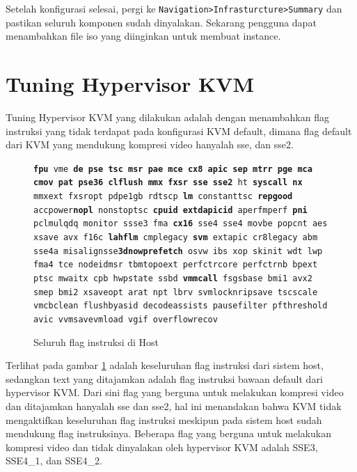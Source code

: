 Setelah konfigurasi selesai, pergi ke \texttt{Navigation>Infrasturcture>Summary} dan pastikan seluruh komponen sudah dinyalakan. Sekarang pengguna dapat menambahkan file iso yang diinginkan untuk membuat instance.

\section{Tuning Hypervisor KVM}
Tuning Hypervisor KVM yang dilakukan adalah dengan menambahkan flag instruksi yang tidak terdapat pada konfigurasi KVM default, dimana flag default dari KVM yang mendukung kompresi video hanyalah sse, dan sse2.

\begin{figure}
    \texttt{\textbf{fpu} vme \textbf{de pse tsc msr pae mce cx8 apic sep mtrr pge mca} \textbf{cmov pat pse36 clflush mmx fxsr sse sse2} ht \textbf{syscall nx} mmxext fxsr\textunderscore opt pdpe1gb rdtscp \textbf{lm} constant\textunderscore tsc \textbf{rep\textunderscore good} acc\textunderscore power\textbf{nopl} nonstop\textunderscore tsc \textbf{cpuid}  \textbf{extd\textunderscore apicid} aperfmperf \textbf{pni} pclmulqdq monitor ssse3 fma \textbf{cx16} sse4 sse4 movbe popcnt aes xsave avx f16c \textbf{lahf\textunderscore lm} cmp\textunderscore legacy \textbf{svm} extapic cr8\textunderscore legacy abm sse4a misalignsse\textbf{3dnowprefetch} osvw ibs xop skinit wdt lwp fma4 tce nodeid\textunderscore msr tbmtopoext perfctr\textunderscore core perfctr\textunderscore nb bpext ptsc mwaitx cpb hw\textunderscore pstate ssbd \textbf{vmmcall} fsgsbase bmi1 avx2 smep bmi2 xsaveopt arat npt lbrv svm\textunderscore locknrip\textunderscore save tsc\textunderscore scale vmcb\textunderscore clean flushbyasid decodeassists pausefilter pfthreshold avic v\textunderscore vmsave\textunderscore vmload vgif overflow\textunderscore recov}
    \caption{Seluruh flag instruksi di Host}
    \label{fig:flag_kvm_host}
\end{figure}

Terlihat pada gambar \ref{fig:flag_kvm_host} adalah keseluruhan flag instruksi dari sistem host, sedangkan text yang ditajamkan adalah flag instruksi bawaan default dari hypervisor KVM. Dari sini flag yang berguna untuk melakukan kompresi video dan ditajamkan hanyalah sse dan sse2, hal ini menandakan bahwa KVM tidak mengaktifkan keseluruhan flag instruksi meskipun pada sistem host sudah mendukung flag instruksinya. Beberapa flag yang berguna untuk melakukan kompresi video dan tidak dinyalakan oleh hypervisor KVM adalah SSE3, SSE4\_1, dan SSE4\_2. 

